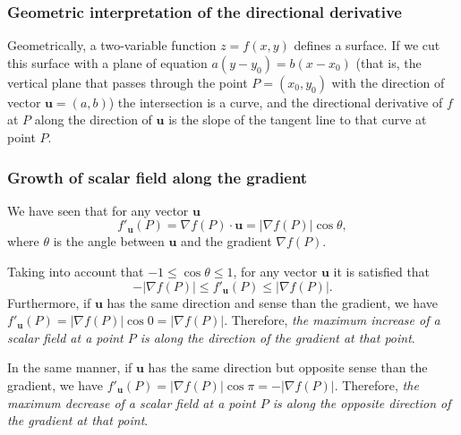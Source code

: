 \begin{frame}
\frametitle{Geometric interpretation of the directional derivative}
Geometrically, a two-variable function $z=f(x,y)$ defines a surface.
If we cut this surface with a plane of equation $a(y-y_0)=b(x-x_0)$ (that is, the vertical plane that passes through the point $P=(x_0,y_0)$ with the direction of vector $\mathbf{u}=(a,b)$)
the intersection is a curve, and the directional derivative of $f$ at $P$ along the direction of $\mathbf{u}$ is the slope of the tangent line to that curve at point $P$.

\begin{center}

\end{center}
\end{frame}



\begin{frame}
\frametitle{Growth of scalar field along the gradient}
We have seen that for any vector $\mathbf{u}$
\[
f'_{\mathbf{u}}(P) = \nabla f(P)\cdot \mathbf{u} = |\nabla f(P)|\cos \theta,
\]
where $\theta$ is the angle between $\mathbf{u}$ and the gradient $\nabla f(P)$.

Taking into account that $-1\leq \cos\theta\leq 1$, for any vector $\mathbf{u}$ it is satisfied that
\[
-|\nabla f(P)|\leq f'_{\mathbf{u}}(P)\leq |\nabla f(P)|.
\]
Furthermore, if $\mathbf{u}$ has the same direction and sense than the gradient, we have $f'_{\mathbf{u}}(P)=|\nabla f(P)|\cos 0=|\nabla f(P)|$.
Therefore, \alert{\emph{the maximum increase of a scalar field at a point $P$ is along the direction of the gradient at that point}}.

In the same manner, if $\mathbf{u}$ has the same direction but opposite sense than the gradient, we have $f'_{\mathbf{u}}(P)=|\nabla f(P)|\cos \pi=-|\nabla f(P)|$.
Therefore, \alert{\emph{the maximum decrease of a scalar field at a point $P$ is along the opposite direction of the gradient at that point}}.
\end{frame}
%
%
